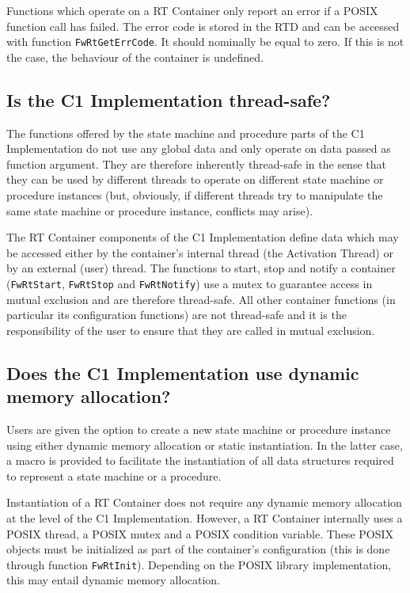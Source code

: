\documentclass[a4paper,10pt]{article}
\begin{document}
Functions which operate on a RT Container only report an error if a POSIX function call has failed. The error code is stored in the RTD and can be accessed with function \texttt{FwRtGetErrCode}. It should nominally be equal to zero. If this is not the case, the behaviour of the container is undefined.

\subsection{Is the C1 Implementation thread-safe?}
The functions offered by the state machine and procedure parts of the C1 Implementation do not use any global data and only operate on data passed as function argument. They are therefore inherently thread-safe in the sense that they can be used by different threads to operate on different state machine or procedure instances (but, obviously, if different threads try to manipulate the same state machine or procedure instance, conflicts may arise).

The RT Container components of the C1 Implementation define data which may be accessed either by the container's internal thread (the Activation Thread) or by an external (user) thread. The functions to start, stop and notify a container (\texttt{FwRtStart}, \texttt{FwRtStop} and \texttt{FwRtNotify}) use a mutex to guarantee access in mutual exclusion and are therefore thread-safe. All other container functions (in particular its configuration functions) are not thread-safe and it is the responsibility of the user to ensure that they are called in mutual exclusion.

\subsection{Does the C1 Implementation use dynamic memory allocation?}
Users are given the option to create a new state machine or procedure instance using either dynamic memory allocation or static instantiation. In the latter case, a macro is provided to facilitate the instantiation of all data structures required to represent a state machine or a procedure.

Instantiation of a RT Container does not require any dynamic memory allocation at the level of the C1 Implementation. However, a RT Container internally uses a POSIX thread, a POSIX mutex and a POSIX condition variable. These POSIX objects must be initialized as part of the container's configuration (this is done through function \texttt{FwRtInit}). Depending on the POSIX library implementation, this may entail dynamic memory allocation.
\end{document}

